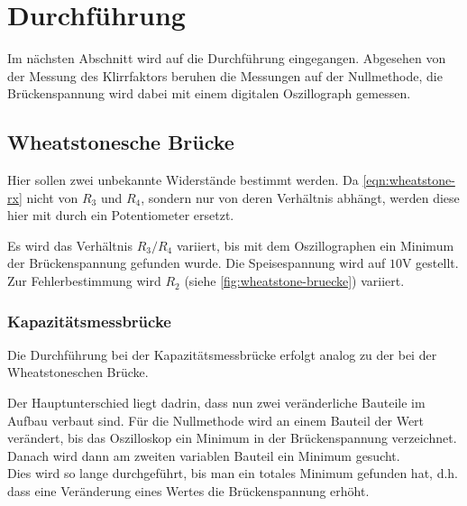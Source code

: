 \section{Durchführung}
\label{sec:Durchführung}
Im nächsten Abschnitt wird auf die Durchführung eingegangen. Abgesehen von der Messung des
Klirrfaktors beruhen die Messungen auf der 
Nullmethode, die Brückenspannung wird dabei mit einem digitalen Oszillograph gemessen.

\subsection{Wheatstonesche Brücke}
\label{sec:ExecWheatstonescheBrücke}

Hier sollen zwei unbekannte Widerstände bestimmt werden. Da \autoref{eqn:wheatstone-rx} nicht von 
$R_3$ und $R_4$, sondern nur von deren Verhältnis abhängt,
werden diese hier mit durch ein Potentiometer ersetzt.

Es wird das Verhältnis $R_3/R_4$ variiert, bis mit dem Oszillographen ein Minimum der Brückenspannung
gefunden wurde. Die Speisespannung wird auf $10\si{\volt}$ gestellt. Zur Fehlerbestimmung wird $R_2$
(siehe \autoref{fig:wheatstone-bruecke}) variiert.

\subsubsection{Kapazitätsmessbrücke}
\label{sec:theorie-kapazitaetsmessbruecke}

Die Durchführung bei der Kapazitätsmessbrücke erfolgt analog zu der bei der Wheatstoneschen Brücke.

Der Hauptunterschied liegt dadrin, dass nun zwei veränderliche Bauteile im Aufbau verbaut sind. Für die
Nullmethode wird an einem Bauteil der Wert verändert, bis das Oszilloskop ein Minimum in der Brückenspannung
verzeichnet. Danach wird dann am zweiten variablen Bauteil ein Minimum gesucht.
\\
Dies wird so lange durchgeführt, bis man ein totales Minimum gefunden hat, d.h. dass eine Veränderung eines
Wertes die Brückenspannung erhöht.
